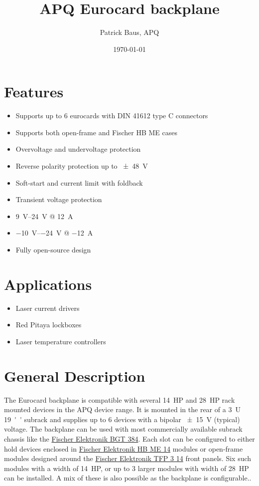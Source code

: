 \documentclass[10pt]{datasheet}
\title{APQ Eurocard backplane}
\author{Patrick Baus, APQ}
\date{\today}
\begin{document}
\maketitle

\section{Features}

\begin{itemize}
\item{Supports up to 6 eurocards with DIN 41612 type C connectors}
\item{Supports both open-frame and Fischer HB ME cases}
\item{Overvoltage and undervoltage protection}
\item{Reverse polarity protection up to \qty{\pm 48}{\V}}
\item{Soft-start and current limit with foldback}
\item{Transient voltage protection}
\item{\qtyrange{9}{24}{\V} @ \qty{12}{\A}}
\item{\qtyrange{-10}{-24}{\V} @ \qty{-12}{\A}}
\item Fully open-source design
\end{itemize}

\section{Applications}

\begin{itemize}
\item{Laser current drivers}
\item{Red Pitaya lockboxes}
\item{Laser temperature controllers}
\end{itemize}

\section{General Description}
The Eurocard backplane is compatible with several \qty{14}{HP} and \qty{28}{HP} rack mounted devices in the APQ device range. It is mounted in the rear of a \qty{3}{U} \qty{19}{''} subrack and supplies up to \num{6} devices with a bipolar \qty{\pm 15}{\V} (typical) voltage. The backplane can be used with most commercially available subrack chassis like the \href{https://www.fischerelektronik.de/web_fischer/en_GB/cases/N05.1/19%22%20subracks/$catalogue/fischerData/PR/BGT384_180/search.xhtml}{Fischer Elektronik BGT 384}.
Each slot can be configured to either hold devices enclosed in \href{https://www.fischerelektronik.com/web_fischer/en_GB/cases/N06.011/19%22%20insert%20modules/$catalogue/fischerData/PR/HBME14_/index.xhtml}{Fischer Elektronik HB ME 14}
modules or open-frame modules designed around the \href{https://www.fischerelektronik.com/web_fischer/en_GB/cases/N06.05/Part%20front%20panels/$catalogue/fischerData/PR/TFP14/index.xhtml}{Fischer Elektronik TFP 3 14}
front panels.
Six such modules with a width of \qty{14}{HP}, or up to 3 larger modules with width of \qty{28}{HP} can be installed. A mix of these is also possible as the backplane is configurable..
\end{document}
